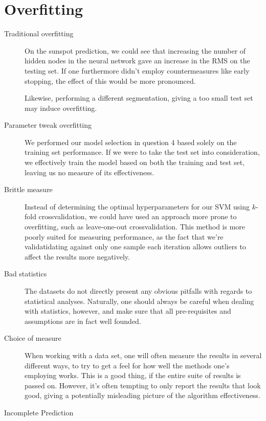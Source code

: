 \documentclass[11pt,a4paper]{article}
\begin{document}
\section{Overfitting}
\begin{description}
    \item[Traditional overfitting] {
        On the sunspot prediction, we could see that increasing the number of
        hidden nodes in the neural network gave an increase in the RMS on the
        testing set. If one furthermore didn't employ countermeasures like
        early stopping, the effect of this would be more pronounced.

        Likewise, performing a different segmentation, giving a too small test
        set may induce overfitting.
    }
    \item[Parameter tweak overfitting] {
        We performed our model selection in question 4 based solely on the
        training set performance. If we were to take the test set into
        consideration, we effectively train the model based on both the
        training and test set, leaving us no measure of its effectiveness.
    }
    \item[Brittle measure] {
        Instead of determining the optimal hyperparameters for our SVM using
        $k$-fold crossvalidation, we could have used an approach more prone
        to overfitting, such as leave-one-out crossvalidation. This method is
        more poorly suited for measuring performance, as the fact that we're
        validatidating against only one sample each iteration allows outliers
        to affect the results more negatively.
    }
    \item[Bad statistics] {
        The datasets do not directly present any obvious pitfalls with
        regards to statistical analyses. Naturally, one should always be
        careful when dealing with statistics, however, and make sure that all
        pre-requisites and assumptions are in fact well founded.
    }
    \item[Choice of measure] {
        When working with a data set, one will often measure the results in
        several different ways, to try to get a feel for how well the methods
        one's employing works. This is a good thing, if the entire suite of
        results is passed on. However, it's often tempting to only report the
        results that look good, giving a potentially misleading picture of the
        algorithm effectiveness.
    }
    \item[Incomplete Prediction] {
}
\end{description}
\end{document}
